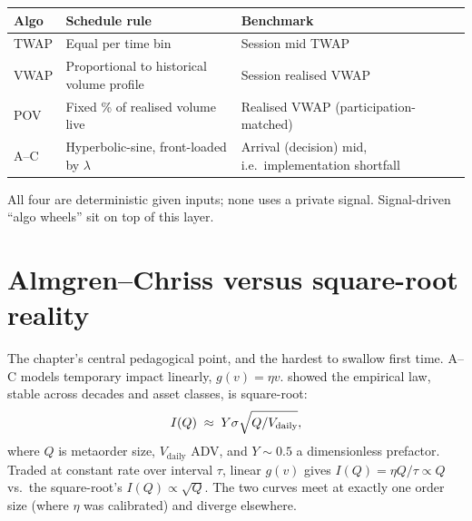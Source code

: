 \begin{keyfactbox}
\begin{center}\footnotesize\begin{tabular}{>{\raggedright\arraybackslash}p{1.3cm}
                                 >{\raggedright\arraybackslash}p{5.8cm}
                                 >{\raggedright\arraybackslash}p{5.8cm}}\toprule
  \textbf{Algo} & \textbf{Schedule rule} & \textbf{Benchmark} \\ \midrule
  TWAP & Equal per time bin & Session mid TWAP \\
  VWAP & Proportional to historical volume profile & Session realised VWAP \\
  POV  & Fixed \% of realised volume live & Realised VWAP (participation-matched) \\
  A--C & Hyperbolic-sine, front-loaded by $\lambda$ & Arrival (decision) mid, i.e.\ implementation shortfall \\
  \bottomrule
\end{tabular}\end{center}
All four are deterministic given inputs; none uses a private
signal. Signal-driven ``algo wheels'' sit on top of this layer.
\end{keyfactbox}

\section{Almgren--Chriss versus square-root reality}
\label{sec:ac_vs_sqrt}

The chapter's central pedagogical point, and the hardest to
swallow first time. A--C models temporary impact linearly,
$g(v) = \eta v$.  showed the empirical
law, stable across decades and asset classes, is square-root:
\begin{equation}
  I(Q) \;\approx\; Y\sigma\sqrt{Q/V_{\text{daily}}},
  \label{eq:ch18_sqrt_recall}
\end{equation}
where $Q$ is metaorder size, $V_{\text{daily}}$ ADV, and $Y \sim
0.5$ a dimensionless prefactor. Traded at constant rate over
interval $\tau$, linear $g(v)$ gives $I(Q) = \eta Q/\tau \propto
Q$ vs.\ the square-root's $I(Q) \propto \sqrt{Q}$. The two curves
meet at exactly one order size (where $\eta$ was calibrated)
and diverge elsewhere.

